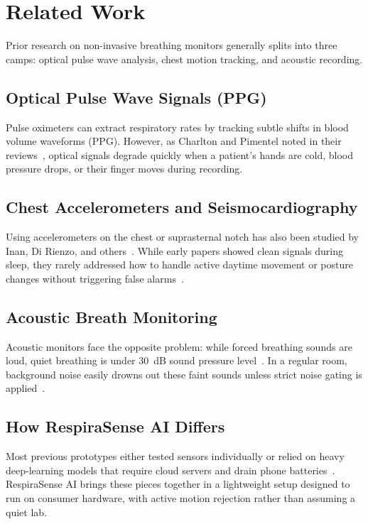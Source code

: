 \documentclass[journal]{IEEEtran}
\begin{document}
\section{Related Work}
Prior research on non-invasive breathing monitors generally splits into three camps: optical pulse wave analysis, chest motion tracking, and acoustic recording.

\subsection{Optical Pulse Wave Signals (PPG)}
Pulse oximeters can extract respiratory rates by tracking subtle shifts in blood volume waveforms (PPG). However, as Charlton and Pimentel noted in their reviews~\cite{charlton2018, pimentel2015}, optical signals degrade quickly when a patient's hands are cold, blood pressure drops, or their finger moves during recording.

\subsection{Chest Accelerometers and Seismocardiography}
Using accelerometers on the chest or suprasternal notch has also been studied by Inan, Di Rienzo, and others~\cite{inverso2018}. While early papers showed clean signals during sleep, they rarely addressed how to handle active daytime movement or posture changes without triggering false alarms~\cite{pandia2019}.

\subsection{Acoustic Breath Monitoring}
Acoustic monitors face the opposite problem: while forced breathing sounds are loud, quiet breathing is under 30~dB sound pressure level~\cite{reyes2014}. In a regular room, background noise easily drowns out these faint sounds unless strict noise gating is applied~\cite{almously2019}.

\subsection{How RespiraSense AI Differs}
Most previous prototypes either tested sensors individually or relied on heavy deep-learning models that require cloud servers and drain phone batteries~\cite{hannun2019}. RespiraSense AI brings these pieces together in a lightweight setup designed to run on consumer hardware, with active motion rejection rather than assuming a quiet lab.
\end{document}
